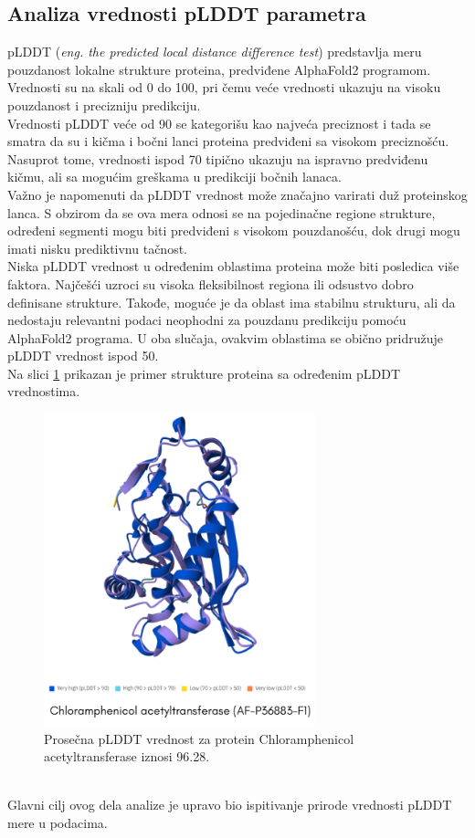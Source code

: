 \documentclass[a4paper,12pt]{article}
\begin{document}
\subsection{Analiza vrednosti pLDDT parametra}
pLDDT (\textit{eng. the predicted local distance difference test}) predstavlja meru pouzdanost lokalne strukture proteina, predviđene AlphaFold2 programom. Vrednosti su na skali od 0 do 100, pri čemu veće vrednosti ukazuju na visoku pouzdanost i precizniju predikciju. \\
Vrednosti pLDDT veće od 90 se kategorišu kao najveća preciznost i tada se smatra da su i kičma i bočni lanci proteina predviđeni sa visokom preciznošću. Nasuprot tome, vrednosti ispod 70 tipično ukazuju na ispravno predviđenu kičmu, ali sa mogućim greškama u predikciji bočnih lanaca. \\
Važno je napomenuti da pLDDT vrednost može značajno varirati duž proteinskog lanca. S obzirom da se ova mera odnosi se na pojedinačne regione strukture, određeni segmenti mogu biti predviđeni s visokom pouzdanošću, dok drugi mogu imati nisku prediktivnu tačnost. \\
Niska pLDDT vrednost u određenim oblastima proteina može biti posledica više faktora. Najčešći uzroci su visoka fleksibilnost regiona ili odsustvo dobro definisane strukture. Takođe, moguće je da oblast ima stabilnu strukturu, ali da nedostaju relevantni podaci neophodni za pouzdanu predikciju pomoću AlphaFold2 programa. U oba slučaja, ovakvim oblastima se obično pridružuje pLDDT vrednost ispod 50.\\ 
Na slici \ref{Slika:plddt} prikazan je primer strukture proteina sa određenim pLDDT vrednostima.
\begin{figure}[htbp]
    	\centering
    	\includegraphics[width=0.7\textwidth]{./images/plddt.png}
    	\caption{Prosečna pLDDT vrednost za protein Chloramphenicol acetyltransferase iznosi 96.28.}
    	\label{Slika:plddt}
\end{figure}
\\
Glavni cilj ovog dela analize je upravo bio ispitivanje prirode vrednosti pLDDT mere u podacima.
\newpage
\end{document}
